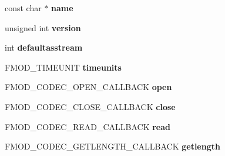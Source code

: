 \begin{DoxyCompactItemize}
\item 
\hypertarget{struct_f_m_o_d___c_o_d_e_c___d_e_s_c_r_i_p_t_i_o_n_a05940e600ec04e217bdd72c93af52f1d}{const char $\ast$ {\bfseries name}}\label{struct_f_m_o_d___c_o_d_e_c___d_e_s_c_r_i_p_t_i_o_n_a05940e600ec04e217bdd72c93af52f1d}

\item 
\hypertarget{struct_f_m_o_d___c_o_d_e_c___d_e_s_c_r_i_p_t_i_o_n_a8dfb836ca79931ee6ca39c12bd8aad3f}{unsigned int {\bfseries version}}\label{struct_f_m_o_d___c_o_d_e_c___d_e_s_c_r_i_p_t_i_o_n_a8dfb836ca79931ee6ca39c12bd8aad3f}

\item 
\hypertarget{struct_f_m_o_d___c_o_d_e_c___d_e_s_c_r_i_p_t_i_o_n_ac79461b38a89c34d2ec2e609736df941}{int {\bfseries defaultasstream}}\label{struct_f_m_o_d___c_o_d_e_c___d_e_s_c_r_i_p_t_i_o_n_ac79461b38a89c34d2ec2e609736df941}

\item 
\hypertarget{struct_f_m_o_d___c_o_d_e_c___d_e_s_c_r_i_p_t_i_o_n_a17d05f38ea3ea759d20d463aa8a8ca9f}{F\+M\+O\+D\+\_\+\+T\+I\+M\+E\+U\+N\+I\+T {\bfseries timeunits}}\label{struct_f_m_o_d___c_o_d_e_c___d_e_s_c_r_i_p_t_i_o_n_a17d05f38ea3ea759d20d463aa8a8ca9f}

\item 
\hypertarget{struct_f_m_o_d___c_o_d_e_c___d_e_s_c_r_i_p_t_i_o_n_ab4bc946139795ab97b95f8c7cb1e43b9}{F\+M\+O\+D\+\_\+\+C\+O\+D\+E\+C\+\_\+\+O\+P\+E\+N\+\_\+\+C\+A\+L\+L\+B\+A\+C\+K {\bfseries open}}\label{struct_f_m_o_d___c_o_d_e_c___d_e_s_c_r_i_p_t_i_o_n_ab4bc946139795ab97b95f8c7cb1e43b9}

\item 
\hypertarget{struct_f_m_o_d___c_o_d_e_c___d_e_s_c_r_i_p_t_i_o_n_af3804c959e5e4d9e3cf03d4a2eaf7ed8}{F\+M\+O\+D\+\_\+\+C\+O\+D\+E\+C\+\_\+\+C\+L\+O\+S\+E\+\_\+\+C\+A\+L\+L\+B\+A\+C\+K {\bfseries close}}\label{struct_f_m_o_d___c_o_d_e_c___d_e_s_c_r_i_p_t_i_o_n_af3804c959e5e4d9e3cf03d4a2eaf7ed8}

\item 
\hypertarget{struct_f_m_o_d___c_o_d_e_c___d_e_s_c_r_i_p_t_i_o_n_abc7836a9cbaecca1c4d5f6b318b0370c}{F\+M\+O\+D\+\_\+\+C\+O\+D\+E\+C\+\_\+\+R\+E\+A\+D\+\_\+\+C\+A\+L\+L\+B\+A\+C\+K {\bfseries read}}\label{struct_f_m_o_d___c_o_d_e_c___d_e_s_c_r_i_p_t_i_o_n_abc7836a9cbaecca1c4d5f6b318b0370c}

\item 
\hypertarget{struct_f_m_o_d___c_o_d_e_c___d_e_s_c_r_i_p_t_i_o_n_a4f7b851d2ec478240bc572f7e4318306}{F\+M\+O\+D\+\_\+\+C\+O\+D\+E\+C\+\_\+\+G\+E\+T\+L\+E\+N\+G\+T\+H\+\_\+\+C\+A\+L\+L\+B\+A\+C\+K {\bfseries getlength}}\label{struct_f_m_o_d___c_o_d_e_c___d_e_s_c_r_i_p_t_i_o_n_a4f7b851d2ec478240bc572f7e4318306}


\end{DoxyCompactItemize}
